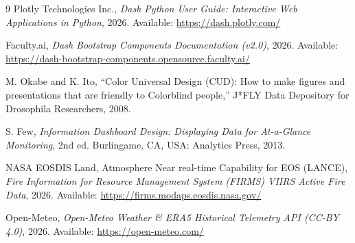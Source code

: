 \documentclass[11pt,a4paper]{article}
\begin{document}
\begin{thebibliography}{9}
Plotly Technologies Inc., \textit{Dash Python User Guide: Interactive Web Applications in Python}, 2026. Available: \url{https://dash.plotly.com/}

Faculty.ai, \textit{Dash Bootstrap Components Documentation (v2.0)}, 2026. Available: \url{https://dash-bootstrap-components.opensource.faculty.ai/}

M. Okabe and K. Ito, ``Color Universal Design (CUD): How to make figures and presentations that are friendly to Colorblind people,'' J*FLY Data Depository for Drosophila Researchers, 2008.

S. Few, \textit{Information Dashboard Design: Displaying Data for At-a-Glance Monitoring}, 2nd ed. Burlingame, CA, USA: Analytics Press, 2013.

NASA EOSDIS Land, Atmosphere Near real-time Capability for EOS (LANCE), \textit{Fire Information for Resource Management System (FIRMS) VIIRS Active Fire Data}, 2026. Available: \url{https://firms.modaps.eosdis.nasa.gov/}

Open-Meteo, \textit{Open-Meteo Weather \& ERA5 Historical Telemetry API (CC-BY 4.0)}, 2026. Available: \url{https://open-meteo.com/}
\end{thebibliography}
\end{document}
